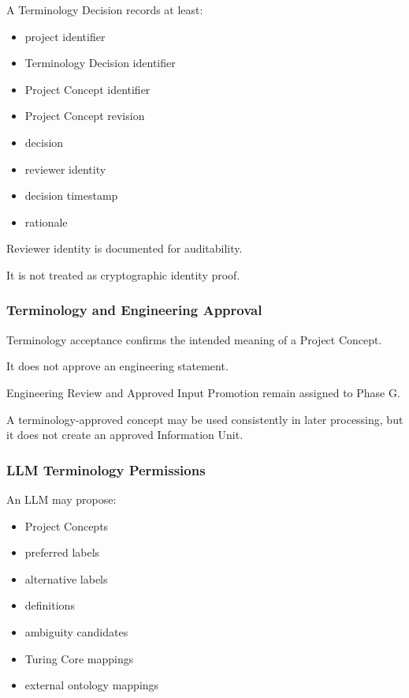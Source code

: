 A Terminology Decision records at least:

\begin{itemize}
\tightlist
\item
  project identifier
\item
  Terminology Decision identifier
\item
  Project Concept identifier
\item
  Project Concept revision
\item
  decision
\item
  reviewer identity
\item
  decision timestamp
\item
  rationale
\end{itemize}

Reviewer identity is documented for auditability.

It is not treated as cryptographic identity proof.

\hypertarget{terminology-and-engineering-approval}{%
\subsubsection{Terminology and Engineering Approval}\label{terminology-and-engineering-approval}}

Terminology acceptance confirms the intended meaning of a Project Concept.

It does not approve an engineering statement.

Engineering Review and Approved Input Promotion remain assigned to Phase G.

A terminology-approved concept may be used consistently in later processing, but it does not create an approved Information Unit.

\hypertarget{llm-terminology-permissions}{%
\subsubsection{LLM Terminology Permissions}\label{llm-terminology-permissions}}

An LLM may propose:

\begin{itemize}
\tightlist
\item
  Project Concepts
\item
  preferred labels
\item
  alternative labels
\item
  definitions
\item
  ambiguity candidates
\item
  Turing Core mappings
\item
  external ontology mappings
\end{itemize}

